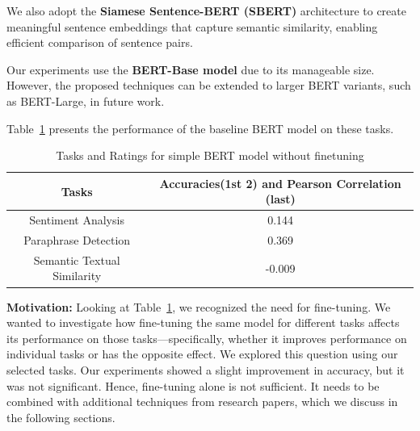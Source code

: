 We also adopt the \textbf{Siamese Sentence-BERT (SBERT)} architecture to create meaningful sentence embeddings that capture semantic similarity, enabling efficient comparison of sentence pairs.\cite{reimers2019sentence}

Our experiments use the \textbf{BERT-Base model} due to its manageable size. However, the proposed techniques can be extended to larger BERT variants, such as BERT-Large, in future work.

Table~\ref{tasks_ratings1} presents the performance of the baseline BERT model on these tasks.
\begin{table}[h]
    \centering
    \begin{tabular}{|c|c|}
        \hline
        Tasks & Accuracies(1st 2) and Pearson Correlation (last) \\ 
        \hline
        Sentiment Analysis & 0.144 \\ 
        Paraphrase Detection & 0.369 \\ 
        Semantic Textual Similarity & -0.009 \\
        \hline
    \end{tabular}
    \caption{Tasks and Ratings for simple BERT model without finetuning}
    \label{tasks_ratings1}
\end{table}

\textbf{Motivation:} Looking at Table~\ref{tasks_ratings1}, we recognized the need for fine-tuning. We wanted to investigate how fine-tuning the same model for different tasks affects its performance on those tasks—specifically, whether it improves performance on individual tasks or has the opposite effect. We explored this question using our selected tasks. Our experiments showed a slight improvement in accuracy, but it was not significant. Hence, fine-tuning alone is not sufficient. It needs to be combined with additional techniques from research papers, which we discuss in the following sections.


